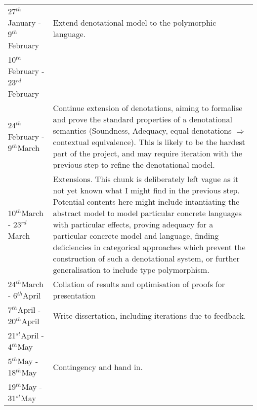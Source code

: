 \documentclass[11pt]{article}
\newcommand{\st}{$^{st}$}
\renewcommand{\th}{$^{th}$}
\newcommand{\rd}{$^{rd}$}
\begin{document}
\begin{tabular}{|p{6cm}||p{10cm}|}
	27\th January - 9\th February &  Extend denotational model to the polymorphic language.
	\\\cline{1-1}
	10\th February - 23\rd February &  \\\hline
	24\th February - 9\th March & Continue extension of denotations, aiming to formalise and prove the standard properties of a denotational semantics (Soundness, Adequacy, equal denotations $\Rightarrow$ contextual equivalence). This is likely to be the hardest part of the project, and may require iteration with the previous step to refine the denotational model. \\\hline
	10\th March - 23\rd March & Extensions. This chunk is deliberately left vague as it not yet known what I might find in the previous step. Potential contents here might include intantiating the abstract model to model particular concrete languages with particular effects, proving adequacy for a particular concrete model and language, finding deficiencies in categorical approaches which prevent the construction of such a denotational system, or further generalisation to include type polymorphism. \\\hline
	24\th March - 6\th April & Collation of results and optimisation of proofs for presentation \\\hline
	7\th April - 20\th April & Write dissertation, including iterations due to feedback. \\\cline{1-1}
	21\st April - 4\th May &\\\hline
	5\th May - 18\th May & Contingency and hand in.\\\cline{1-1}
	19\th May - 31\st May & \\
\hline
\end{tabular}

\newpage
\appendix
\end{document}
